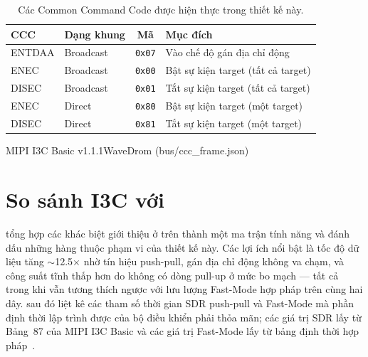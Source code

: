 \begin{table}[!htb]\centering
  \caption{Các Common Command Code được hiện thực trong thiết kế này.}
  \label{tab:ccc-supported}
  \small
  \begin{tabular}{@{}llcl@{}}
    \toprule
    \textbf{CCC} & \textbf{Dạng khung} & \textbf{Mã} & \textbf{Mục đích} \\
    \midrule
    ENTDAA & Broadcast        & \texttt{0x07} & Vào chế độ gán địa chỉ động \\
    ENEC   & Broadcast        & \texttt{0x00} & Bật sự kiện target (tất cả target) \\
    DISEC  & Broadcast        & \texttt{0x01} & Tắt sự kiện target (tất cả target) \\
    ENEC   & Direct           & \texttt{0x80} & Bật sự kiện target (một target) \\
    DISEC  & Direct           & \texttt{0x81} & Tắt sự kiện target (một target) \\
    \bottomrule
  \end{tabular}
\end{table}

  {MIPI I3C Basic v1.1.1}{WaveDrom (bus/ccc_frame.json)}

\section{So sánh I3C với \iic{}}
\label{sec:bg-comparison}

 tổng hợp các khác biệt giới thiệu ở trên thành một ma trận tính năng và
đánh dấu những hàng thuộc phạm vi của thiết kế này. Các lợi ích nổi bật là tốc độ dữ liệu tăng
$\sim$12.5$\times$ nhờ tín hiệu push-pull, gán địa chỉ động không va chạm, và công suất tĩnh
thấp hơn do không có dòng pull-up ở mức bo mạch --- tất cả trong khi vẫn tương thích ngược với
lưu lượng \iic{} Fast-Mode hợp pháp trên cùng hai dây.  sau đó liệt kê
các tham số thời gian SDR push-pull và \iic{} Fast-Mode mà phần định thời lập trình được của bộ
điều khiển phải thỏa mãn; các giá trị SDR lấy từ Bảng~87 của MIPI I3C Basic và các giá trị
Fast-Mode lấy từ bảng định thời \iic{} hợp pháp~\cite{mipi_i3c_basic}.

